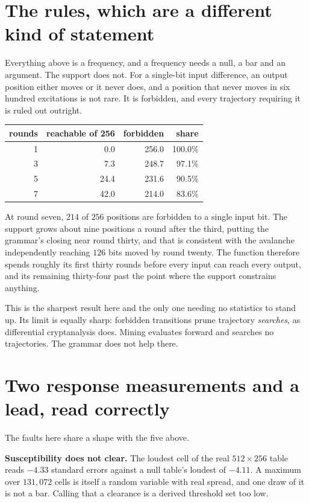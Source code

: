 \section{The rules, which are a different kind of statement}

Everything above is a frequency, and a frequency needs a null, a bar and an argument. The support does not. For a single-bit input difference, an output position either moves or it never does, and a position that never moves in six hundred excitations is not rare. It is forbidden, and every trajectory requiring it is ruled out outright.

\begin{center}
\begin{tabular}{@{}rrrr@{}}
\toprule
rounds & reachable of 256 & forbidden & share \\
\midrule
1 & 0.0 & 256.0 & 100.0\% \\
3 & 7.3 & 248.7 & 97.1\% \\
5 & 24.4 & 231.6 & 90.5\% \\
7 & 42.0 & 214.0 & 83.6\% \\
\bottomrule
\end{tabular}
\end{center}

At round seven, \(214\) of \(256\) positions are forbidden to a single input bit. The support grows about nine positions a round after the third, putting the grammar's closing near round thirty, and that is consistent with the avalanche independently reaching \(126\) bits moved by round twenty. The function therefore spends roughly its first thirty rounds before every input can reach every output, and its remaining thirty-four past the point where the support constrains anything.

This is the sharpest result here and the only one needing no statistics to stand up. Its limit is equally sharp: forbidden transitions prune trajectory \emph{searches}, as differential cryptanalysis does. Mining evaluates forward and searches no trajectories. The grammar does not help there.

\section{Two response measurements and a lead, read correctly}

The faults here share a shape with the five above.

\textbf{Susceptibility does not clear.} The loudest cell of the real \(512 \times 256\) table reads \(-4.33\) standard errors against a null table's loudest of \(-4.11\). A maximum over \(131{,}072\) cells is itself a random variable with real spread, and one draw of it is not a bar. Calling that a clearance is a derived threshold set too low.

